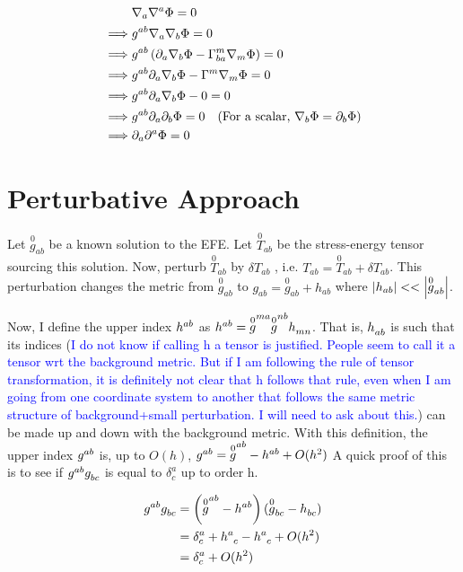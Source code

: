 \begin{align*}
   &     \nabla_a \nabla^a \Phi =0 \\
    \implies & g^{ab} \nabla_a \nabla_b \Phi =0 \\
    \implies & g^{ab} \left( \partial_a \nabla_b \Phi- \Gamma_{ba}^{m} \nabla_m \Phi \right)=0\\
    \implies& g^{ab} \partial_a \nabla_b \Phi - \Gamma^m \nabla_m \Phi = 0\\
    \implies & g^{ab} \partial_a \nabla_b \Phi -0 =0 \\
    \implies & g^{ab} \partial_a \partial_b \Phi =0 \;\;\;\left( \text{For a scalar, $\nabla_b \Phi = \partial_b \Phi$} \right)\\
    \implies & \partial_a \partial^a \Phi =0 \\
\end{align*}


\section{Perturbative Approach}

Let $\overset{0}{g}_{ab}$ be a known solution to the EFE. Let $\overset{0}{T}_{ab}$ be the stress-energy tensor sourcing this solution. Now, perturb $\overset{0}{T}_{ab}$ by $\delta T_{ab}$ , i.e. $T_{ab} = \overset{0}{T}_{ab}+ \delta T_{ab}$. This perturbation changes the metric from $\overset{0}{g}_{ab}$ to $g_{ab}= \overset{0}{g}_{ab}+ h_{ab}$ where $\abs{h_{ab}}<<\abs{\overset{0}{g}_{ab}}$.

Now, I define the upper index $\tt{h}{ab}{}$ as $\tt{h}{ab}{}= \tt{\overset{0}{g}   }{ma}{}\tt{\overset{0}{g}}{nb}{}\tt{h}{}{mn}$. That is, $\tt{h}{}{ab}$ is such that its indices (\textcolor{blue}{I do not know if calling h a tensor is justified. People seem to call it a tensor wrt the background metric. But if I am following the rule of tensor transformation, it is definitely not clear that h follows that rule, even when I am going from one coordinate system to another that follows the same metric structure of background+small perturbation. I will need to ask about this.}) can be made up and down with the background metric. With this definition, the upper index $\tt{g}{ab}{}$ is, up to $O(h)$, $\tt{g}{ab}{}= \tt{\overset{0}{g }}{ab}{}-\tt{h}{ab}{}+ O(\tt{h}{2}{})$
A quick proof of this is to see if $\tt{g}{ab}{}\tt{g}{}{bc}$ is equal to $\delta^a_c$ up to order h. 

\begin{align*}
    \tt{g}{ab}{}\tt{g}{}{bc} &= \lera{\tt{\overset{0}{g}}{ab}{}-\tt{h}{ab}{}}\lera{\tt{\ol{0}{g}}{}{bc}-\tt{h}{}{bc}}\\
    &= \delta^a_c + \tt{h}{a}{c}-\tt{h}{a}{c}+ O(h^2)\\
    &= \delta^a_c+O(h^2)\\
\end{align*}

